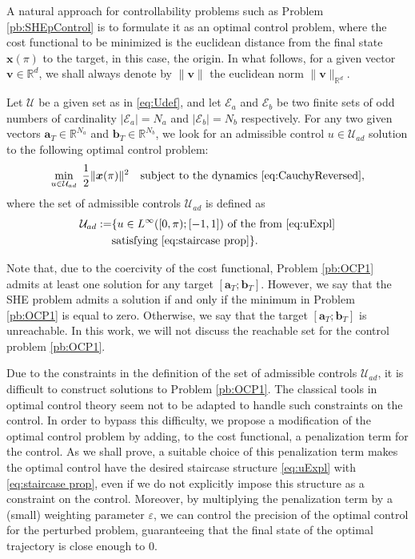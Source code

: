 \documentclass[twocolumn]{autart}    %
\begin{document}
A natural approach for controllability problems such as Problem \ref{pb:SHEpControl} is to formulate it as an optimal control problem, where the cost functional to be minimized is the euclidean distance from the final state $\bm{x}(\pi)$ to the target, in this case, the origin.
In what follows, for a given vector $\bm{v}\in\mathbb{R}^d$, we shall always denote by $\|\bm{v}\|$ the euclidean norm $\|\bm{v}\|_{\mathbb{R}^d}$.
\newline


\begin{problem}\label{pb:OCP1}
 Let $\mathcal{U}$ be a given set as in \eqref{eq:Udef},  and let $\mathcal{E} _a $ and $\mathcal{E} _b $ be two finite sets of odd numbers of cardinality $|\mathcal{E}_a| = N_a $ and $ |\mathcal{E} _b| = N_b$ respectively.
    For any two given vectors 
    $\bm{a}_T \in \mathbb{R}^{N_a}$ and $\bm{b}_T \in \mathbb{R}^{N_b} $,  
    we look for an admissible control $u\in \mathcal{U}_{ad}$ solution to the following optimal control problem:
\begin{equation*}
	\min_{u \in \mathcal{U}_{ad}}\;\frac 12 \|\bm{x}(\pi)\|^2 \quad \text{subject to the dynamics \eqref{eq:CauchyReversed}},
    \end{equation*}
    where the set of admissible controls $\mathcal{U}_{ad}$ is defined as
    \begin{align*}
    \mathcal{U}_{ad} := & \{ u\in L^\infty ([0,\pi); [-1,1]) \ \text{of the from \eqref{eq:uExpl}}  \\
    & \text{satisfying \eqref{eq:staircase prop}} \}.
    \end{align*}
\end{problem}

\begin{remark}
Note that, due to the coercivity of the cost functional, Problem \ref{pb:OCP1} admits at least one solution for any target $[\bm{a}_T;\bm{b}_T]$. However, we say that the SHE problem admits a solution if and only if the minimum in Problem \ref{pb:OCP1} is equal to zero. Otherwise, we say that the target $[\bm{a}_T;\bm{b}_T]$ is unreachable.
In this work, we will not discuss the reachable set for the control problem \eqref{pb:OCP1}.
\end{remark}

Due to the constraints in the definition of the set of admissible controls $\mathcal{U}_{ad}$,  it is difficult to construct solutions to Problem \ref{pb:OCP1}.
The classical tools in optimal control theory seem not to be adapted to handle such constraints on the control.
In order to bypass this difficulty, we propose a modification of the optimal control problem by adding, to the cost functional, a penalization term for the control.
As we shall prove, a suitable choice of this penalization term makes the optimal control have the desired staircase structure \eqref{eq:uExpl} with \eqref{eq:staircase prop}, even if we do not explicitly impose this structure as a constraint on the control.
Moreover, by multiplying the penalization term by a (small) weighting parameter $\varepsilon$, we can control the precision of the optimal control for the perturbed problem, guaranteeing that the final state of the optimal trajectory is close enough to 0.
\end{document}
